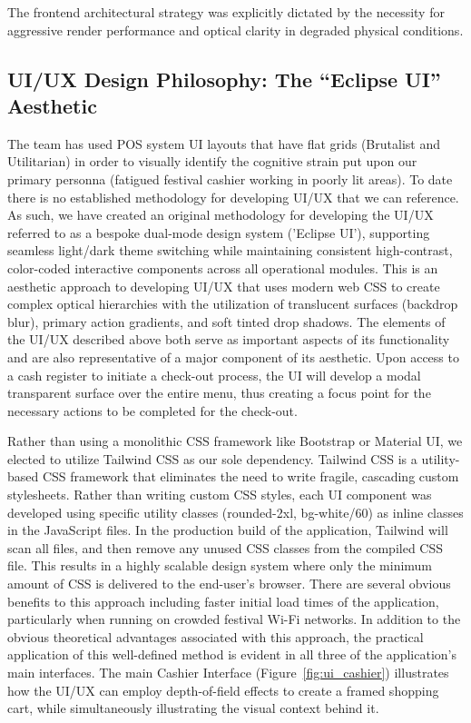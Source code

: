 The frontend architectural strategy was explicitly dictated by the necessity for aggressive render performance and optical clarity in degraded physical conditions.

\subsection{UI/UX Design Philosophy: The ``Eclipse UI'' Aesthetic}

The team has used POS system UI layouts that have flat grids (Brutalist and Utilitarian) in order to visually identify the cognitive strain put upon our primary personna (fatigued festival cashier working in poorly lit areas).
To date there is no established methodology for developing UI/UX that we can reference. As such, we have created an original methodology for developing the UI/UX referred to as a bespoke dual-mode design system ('Eclipse UI'), supporting seamless light/dark theme switching while maintaining consistent high-contrast, color-coded interactive components across all operational modules. This is an aesthetic approach to developing UI/UX that uses modern web CSS to create complex optical hierarchies with the utilization of translucent surfaces (backdrop blur), primary action gradients, and soft tinted drop shadows. The elements of the UI/UX described above both serve as important aspects of its functionality and are also representative of a major component of its aesthetic. Upon access to a cash register to initiate a check-out process, the UI will develop a modal transparent surface over the entire menu, thus creating a focus point for the necessary actions to be completed for the check-out.

Rather than using a monolithic CSS framework like Bootstrap or Material UI, we elected to utilize Tailwind CSS as our sole dependency. Tailwind CSS is a utility-based CSS framework that eliminates the need to write fragile, cascading custom stylesheets. Rather than writing custom CSS styles, each UI component was developed using specific utility classes (rounded-2xl, bg-white/60) as inline classes in the JavaScript files. In the production build of the application, Tailwind will scan all files, and then remove any unused CSS classes from the compiled CSS file. This results in a highly scalable design system where only the minimum amount of CSS is delivered to the end-user’s browser. There are several obvious benefits to this approach including faster initial load times of the application, particularly when running on crowded festival Wi-Fi networks.
In addition to the obvious theoretical advantages associated with this approach, the practical application of this well-defined method is evident in all three of the application's main interfaces. The main Cashier Interface (Figure~\ref{fig:ui_cashier}) illustrates how the UI/UX can employ depth-of-field effects to create a framed shopping cart, while simultaneously illustrating the visual context behind it.


